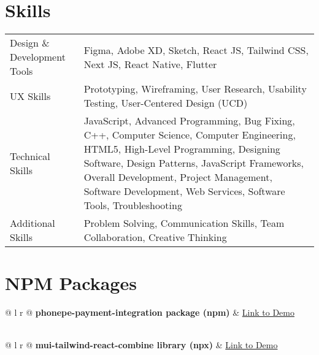 \documentclass[a4paper,12pt]{article}
\begin{document}
\section{Skills}
\begin{tabularx}{\linewidth}{@{} l X @{}}
Design \& Development Tools & \normalsize{Figma, Adobe XD, Sketch, React JS, Tailwind CSS, Next JS, React Native, Flutter} \\
UX Skills & \normalsize{Prototyping, Wireframing, User Research, Usability Testing, User-Centered Design (UCD)} \\
Technical Skills & \normalsize{JavaScript, Advanced Programming, Bug Fixing, C++, Computer Science, Computer Engineering, HTML5, High-Level Programming, Designing Software, Design Patterns, JavaScript Frameworks, Overall Development, Project Management, Software Development, Web Services, Software Tools, Troubleshooting} \\
Additional Skills & \normalsize{Problem Solving, Communication Skills, Team Collaboration, Creative Thinking} \\
\end{tabularx}

\section{NPM Packages}
\begin{tabularx}{\linewidth}{@{} l r @{}}
\textbf{phonepe-payment-integration package (npm)} & \hfill \href{https://www.npmjs.com/package/phonepe-payment-integration}{Link to Demo} \\[3.75pt]
 \\
\end{tabularx}

\begin{tabularx}{\linewidth}{@{} l r @{}}
\textbf{mui-tailwind-react-combine library (npx)} & \hfill \href{https://www.npmjs.com/package/react-mui-tailwind_css_frontend}{Link to Demo} \\[3.75pt]
 \\
\end{tabularx}

\end{document}
